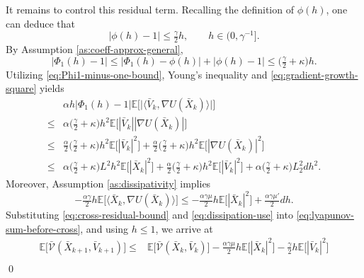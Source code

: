 \documentclass[12pt]{article}
\numberwithin{equation}{section}
\renewenvironment{proof}%
  {\begin{trivlist}%
   \item[]\ignorespaces}%
  {\qed\end{trivlist}}
\begin{document}
\begin{proof}
It remains to control this residual term.  Recalling the definition of $\phi(h)$, one can deduce that
\[
|\phi(h)-1|
\leq
\tfrac{\gamma}{2}h,
\qquad
h\in(0,\gamma^{-1}].
\]
By Assumption \ref{as:coeff-approx-general}, 
\begin{equation}
\label{eq:Phi1-minus-one-bound}
|\Phi_1(h)-1|
\leq
|\Phi_1(h)-\phi(h)|
+
|\phi(h)-1|
\leq
\big(
\tfrac{\gamma}{2}+\kappa
\big)h .
\end{equation}
Utilizing \eqref{eq:Phi1-minus-one-bound}, Young's inequality and \eqref{eq:gradient-growth-square} yields
\begin{equation}
\label{eq:cross-residual-bound}
\begin{aligned}
&
\alpha h
\big|
\Phi_1(h)-1
\big|
\mathbb E
\Big[
\big|
\big\langle
\bar V_k,
\nabla U(\bar X_k)
\big\rangle
\big|
\Big]
\\  
\leq&
\alpha
\big(
\tfrac{\gamma}{2}+\kappa
\big)h^2
\mathbb E
\Big[
|\bar V_k|
|\nabla U(\bar X_k)|
\Big]
\\
\leq&
\tfrac{\alpha}{2}
\big(
\tfrac{\gamma}{2}+\kappa
\big)h^2
\mathbb E
\Big[
|\bar V_k|^2
\Big]
+
\tfrac{\alpha}{2}
\big(
\tfrac{\gamma}{2}+\kappa
\big)h^2
\mathbb E
\Big[
|\nabla U(\bar X_k)|^2
\Big]
\\
\leq&
\alpha
\big(
\tfrac{\gamma}{2}+\kappa
\big)L^2h^2
\mathbb E
\Big[
|\bar X_k|^2
\Big]
+
\tfrac{\alpha}{2}
\big(
\tfrac{\gamma}{2}+\kappa
\big)h^2
\mathbb E
\Big[
|\bar V_k|^2
\Big]
+
\alpha
\big(
\tfrac{\gamma}{2}+\kappa
\big)L_2^2dh^2 .
\end{aligned}
\end{equation}
Moreover, Assumption \ref{as:dissipativity} implies
\begin{equation}
\label{eq:dissipation-use}
-\tfrac{\alpha\gamma}{2}h
\mathbb E
\Big[
\big\langle
\bar X_k,
\nabla U(\bar X_k)
\big\rangle
\Big]
\leq
-\tfrac{\alpha\gamma\mu}{2}h
\mathbb E
\Big[
|\bar X_k|^2
\Big]
+
\tfrac{\alpha\gamma\mu'}{2}dh .
\end{equation}
Substituting \eqref{eq:cross-residual-bound} and \eqref{eq:dissipation-use} into \eqref{eq:lyapunov-sum-before-cross}, and using $h\leq1$, we arrive at
\begin{equation}
\label{eq:lyapunov-before-absorb}
\begin{aligned}
\mathbb E
\Big[
\bar{\mathcal V}(\bar X_{k+1},\bar V_{k+1})
\Big]
\leq&
\mathbb E
\Big[
\bar{\mathcal V}(\bar X_k,\bar V_k)
\Big]
-
\tfrac{\alpha\gamma\mu}{2} h
\mathbb E
\Big[
|\bar X_k|^2
\Big]
-
\tfrac{\gamma}{2} h
\mathbb E
\Big[
|\bar V_k|^2
\Big]
\\

\end{aligned}
\end{equation}
\end{proof}
\end{document}

